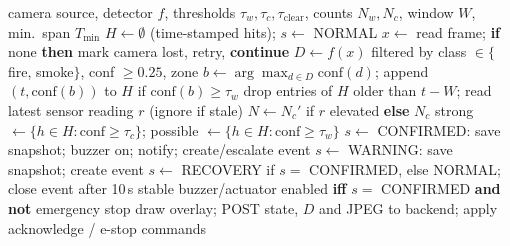 \documentclass[conference]{IEEEtran}
\begin{document}
\begin{algorithm}[t]
\caption{Real-Time Detection, Confirmation and Alerting}
\label{alg:main}
\begin{algorithmic}[1]
\REQUIRE camera source, detector $f$, thresholds $\tau_w,\tau_c,\tau_{\mathrm{clear}}$, counts $N_w,N_c$, window $W$, min.\ span $T_{\min}$
\STATE $H\leftarrow\emptyset$ (time-stamped hits); $s\leftarrow$ NORMAL
  \STATE $x\leftarrow$ read frame; \textbf{if} none \textbf{then} mark camera lost, retry, \textbf{continue}
  \STATE $D\leftarrow f(x)$ filtered by class $\in\{$fire, smoke$\}$, conf $\ge0.25$, zone
  \STATE $b\leftarrow\arg\max_{d\in D}\mathrm{conf}(d)$; append $(t,\mathrm{conf}(b))$ to $H$ if $\mathrm{conf}(b)\ge\tau_w$
  \STATE drop entries of $H$ older than $t-W$; read latest sensor reading $r$ (ignore if stale)
  \STATE $N\leftarrow N_c'$ if $r$ elevated \textbf{else} $N_c$
  \STATE strong $\leftarrow\{h\in H:\mathrm{conf}\ge\tau_c\}$; possible $\leftarrow\{h\in H:\mathrm{conf}\ge\tau_w\}$
     \STATE $s\leftarrow$ CONFIRMED: save snapshot; buzzer on; notify; create/escalate event
     \STATE $s\leftarrow$ WARNING: save snapshot; create event
     \STATE $s\leftarrow$ RECOVERY if $s=$ CONFIRMED, else NORMAL; close event after 10\,s stable
  \ENDIF
  \STATE buzzer/actuator enabled \textbf{iff} $s=$ CONFIRMED \textbf{and not} emergency stop
  \STATE draw overlay; POST state, $D$ and JPEG to backend; apply acknowledge / e-stop commands
\ENDWHILE
\end{algorithmic}
\end{algorithm}
\end{document}
